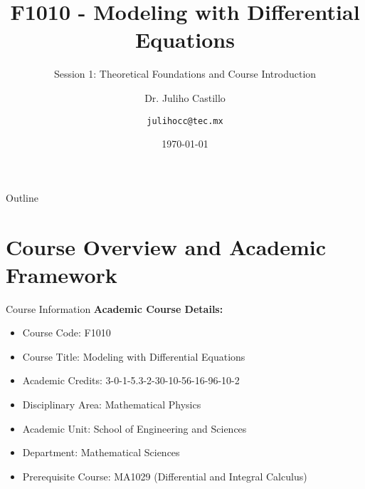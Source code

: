 \documentclass[10pt,aspectratio=169]{beamer}
\title{F1010 - Modeling with Differential Equations}
\subtitle{Session 1: Theoretical Foundations and Course Introduction}
\author{Dr. Juliho Castillo \and \texttt{julihocc@tec.mx}}
\institute{Tec de Monterrey}
\date{\today}
\newcommand{\concept}[1]{\textcolor{mDarkTeal}{\textbf{#1}}}
\begin{document}
\maketitle

\begin{frame}{Outline}
    \tableofcontents
\end{frame}

\section{Course Overview and Academic Framework}

\begin{frame}{Course Information}
    \concept{Academic Course Details:}
    \begin{itemize}
        \item Course Code: F1010
        \item Course Title: Modeling with Differential Equations
        \item Academic Credits: 3-0-1-5.3-2-30-10-56-16-96-10-2
        \item Disciplinary Area: Mathematical Physics
        \item Academic Unit: School of Engineering and Sciences
        \item Department: Mathematical Sciences
        \item Prerequisite Course: MA1029 (Differential and Integral Calculus)
    \end{itemize}
\end{frame}
\end{document}
